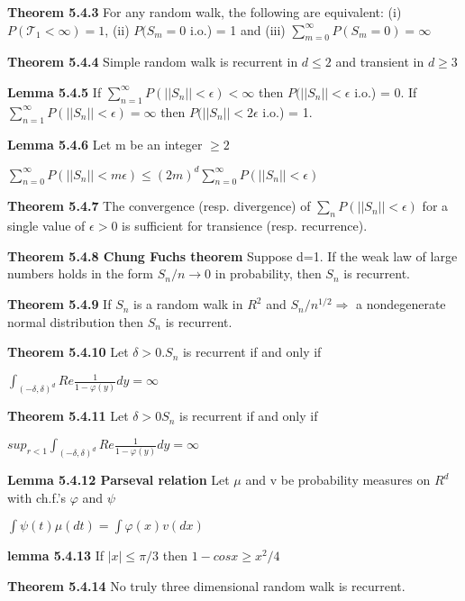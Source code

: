 \documentclass{article}
\begin{document}
\textbf {Theorem 5.4.3} For any random walk, the following are equivalent: (i) $P(\mathcal{T}_1 < \infty) = 1$, (ii) $P(S_m = 0$ i.o.) = 1 and (iii) $\sum_{m=0}^{\infty} P(S_m = 0) = \infty$

\textbf {Theorem 5.4.4} Simple random walk is recurrent in $d \leq 2$ and transient in $d \geq 3$

\textbf {Lemma 5.4.5} If $\sum_{n=1}^\infty P(||S_n|| < \epsilon) < \infty$ then $P(||S_n|| < \epsilon$ i.o.) = 0. If $\sum_{n=1}^\infty P(||S_n|| < \epsilon) = \infty$ then $P(||S_n|| < 2\epsilon$ i.o.) = 1.

\textbf {Lemma 5.4.6} Let m be an integer $\geq 2$
\begin{center}
$\sum_{n=0}^\infty P(||S_n|| < m\epsilon) \leq (2m)^d \sum_{n=0}^\infty P(||S_n|| < \epsilon)$
\end{center}

\textbf {Theorem 5.4.7} The convergence (resp. divergence) of $\sum_n P(||S_n|| < \epsilon)$ for a single value of $\epsilon > 0$ is sufficient for transience (resp. recurrence).

\textbf {Theorem 5.4.8 Chung Fuchs theorem} Suppose d=1. If the weak law of large numbers holds in the form $S_n / n \to 0$ in probability, then $S_n$ is recurrent.

\textbf {Theorem 5.4.9} If $S_n$ is a random walk in $R^2$ and $S_n / n^{1/2} \Rightarrow$ a nondegenerate normal distribution then $S_n$ is recurrent.

\textbf {Theorem 5.4.10} Let $\delta > 0. S_n$ is recurrent if and only if 
\begin{center}
$\int_{(-\delta, \delta)^d} Re \frac{1}{1-\varphi(y)} dy = \infty$
\end{center}

\textbf {Theorem 5.4.11} Let $\delta > 0 S_n$ is recurrent if and only if
\begin{center}
$sup_{r < 1} \int_{(-\delta, \delta)^d} Re \frac{1}{1-\varphi(y)} dy = \infty$
\end{center}

\textbf {Lemma 5.4.12 Parseval relation} Let $\mu$ and v be probability measures on $R^d$ with ch.f.'s $\varphi$ and $\psi$
\begin{center}
$\int \psi (t) \mu (dt) = \int \varphi(x) v(dx)$
\end{center}

\textbf {lemma 5.4.13} If $|x| \leq \pi/3$ then $1 - cosx \geq x^2 / 4$

\textbf {Theorem 5.4.14} No truly three dimensional random walk is recurrent.
\end{document}
